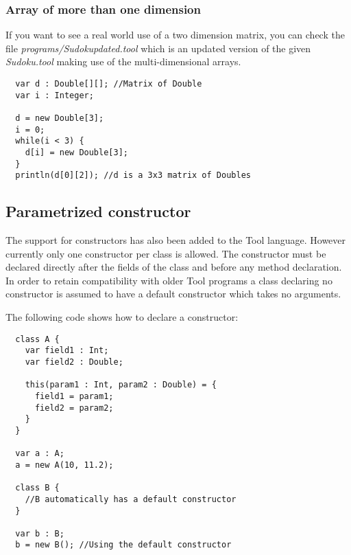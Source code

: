 \subsubsection{Array of more than one dimension}
If you want to see a real world use of a two dimension matrix, you can
check the file \emph{programs/Sudokupdated.tool} which is an updated
version of the given \emph{Sudoku.tool} making use of the
multi-dimensional arrays.

\begin{lstlisting}
  var d : Double[][]; //Matrix of Double
  var i : Integer;

  d = new Double[3];
  i = 0;
  while(i < 3) {
    d[i] = new Double[3];
  }
  println(d[0][2]); //d is a 3x3 matrix of Doubles
\end{lstlisting}

\subsection{Parametrized constructor}

The support for constructors has also been added to the Tool
language. However currently only one constructor per class is
allowed. The constructor must be declared directly after the fields of
the class and before any method declaration. In order to retain
compatibility with older Tool programs a class declaring no
constructor is assumed to have a default constructor which takes no
arguments.

The following code shows how to declare a constructor:
\begin{lstlisting}
  class A {
    var field1 : Int;
    var field2 : Double;

    this(param1 : Int, param2 : Double) = {
      field1 = param1;
      field2 = param2;
    }
  }

  var a : A;
  a = new A(10, 11.2);

  class B {
    //B automatically has a default constructor
  }

  var b : B;
  b = new B(); //Using the default constructor
\end{lstlisting}
